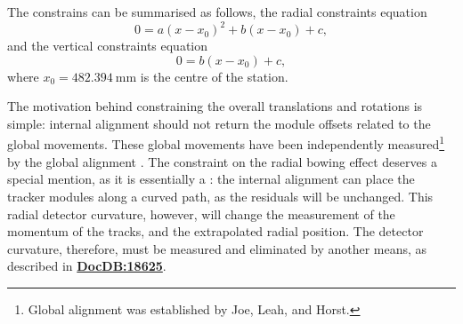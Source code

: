 \documentclass[12pt]{article}
\begin{document}
The constrains can be summarised as follows, the radial constraints equation
\begin{equation}
    0=a(x-x_0)^2+b(x-x_0)+c,   
\end{equation}
and the vertical constraints equation  
\begin{equation}
    0=b(x-x_0)+c,
\end{equation}
where $x_0=\SI{482.394}{\milli\metre}$ is the centre of the station.

The motivation behind constraining the overall translations and rotations is simple: internal alignment should not return the module offsets related to the global movements. These global movements have been independently measured\footnote{Global alignment was established by Joe, Leah, and Horst.} by the global alignment \cite{Joe}. The constraint on the radial bowing effect deserves a special mention, as it is essentially a : the internal alignment can place the tracker modules along a curved path, as the residuals will be unchanged. This radial detector curvature, however, will change the measurement of the momentum of the tracks, and the extrapolated radial position. The detector curvature, therefore, must be measured and eliminated by another means, as described in \textbf{\href{https://gm2-docdb.fnal.gov/cgi-bin/private/ShowDocument?docid=18625}{DocDB:18625}}.
\end{document}
